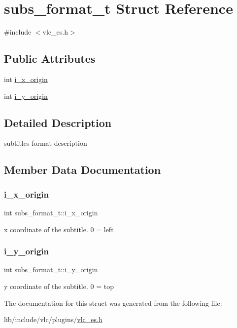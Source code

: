 \hypertarget{structsubs__format__t}{}\section{subs\+\_\+format\+\_\+t Struct Reference}
\label{structsubs__format__t}


{\ttfamily \#include $<$vlc\+\_\+es.\+h$>$}

\subsection*{Public Attributes}
\begin{DoxyCompactItemize}
\item 
int \hyperlink{structsubs__format__t_a0def06c3f6c0de2061e07df27e32374e}{i\+\_\+x\+\_\+origin}
\item 
int \hyperlink{structsubs__format__t_a893573a3a28bf659707e1e3c60bf11f5}{i\+\_\+y\+\_\+origin}
\end{DoxyCompactItemize}


\subsection{Detailed Description}
subtitles format description 

\subsection{Member Data Documentation}
\mbox{\label{structsubs__format__t_a0def06c3f6c0de2061e07df27e32374e}} 
\subsubsection{\texorpdfstring{i\+\_\+x\+\_\+origin}{i\_x\_origin}}
{\footnotesize\ttfamily int subs\+\_\+format\+\_\+t\+::i\+\_\+x\+\_\+origin}

x coordinate of the subtitle. 0 = left \mbox{\label{structsubs__format__t_a893573a3a28bf659707e1e3c60bf11f5}} 
\subsubsection{\texorpdfstring{i\+\_\+y\+\_\+origin}{i\_y\_origin}}
{\footnotesize\ttfamily int subs\+\_\+format\+\_\+t\+::i\+\_\+y\+\_\+origin}

y coordinate of the subtitle. 0 = top 

The documentation for this struct was generated from the following file\+:\begin{DoxyCompactItemize}
\item 
lib/include/vlc/plugins/\hyperlink{vlc__es_8h}{vlc\+\_\+es.\+h}\end{DoxyCompactItemize}
